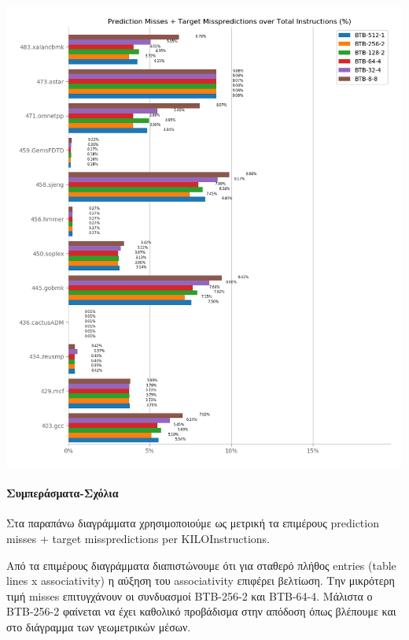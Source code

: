    \begin{minipage}{\textwidth}
      \begin{center}
         \\
         \vspace{3mm}
         \includegraphics[width=\textwidth, frame]{./graphs/4-3/bar_chart.png}
         \vspace{6mm}
      \end{center}
   \end{minipage}

\paragraph{Συμπεράσματα-Σχόλια}
   Στα παραπάνω διαγράμματα χρησιμοποιούμε ως μετρική τα επιμέρους prediction misses +
   target misspredictions per KILOInstructions.

   Από τα επιμέρους διαγράμματα διαπιστώνουμε ότι για σταθερό πλήθος entries
   (table lines x associativity) η αύξηση του associativity επιφέρει βελτίωση.
   Την μικρότερη τιμή misses επιτυγχάνουν οι συνδυασμοί BTB-256-2 και BTB-64-4.
   Μάλιστα ο BTB-256-2 φαίνεται να έχει καθολικό προβάδισμα στην απόδοση όπως
   βλέπουμε και στο διάγραμμα των γεωμετρικών μέσων. 

